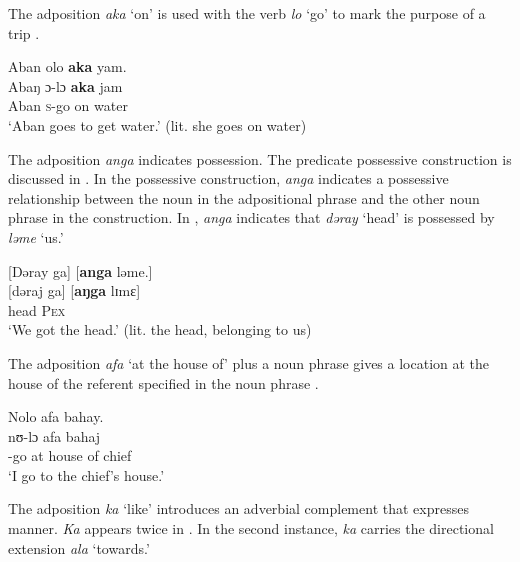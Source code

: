 The adposition \textit{aka}  ‘on’ is used with the verb \textit{lo} ‘go’ to mark the purpose of a trip .

\ea \label{ex:5:132}
Aban  olo  \textbf{aka}  yam.\\
\gll  Abaŋ  ɔ{}-lɔ   \textbf{aka}   jam\\
      Aban  \textsc{s}-go  on  water\\
\glt  ‘Aban goes to get water.’ (lit. she goes on water)
\z

The adposition \textit{anga} indicates possession. The predicate possessive construction is discussed in . In the possessive construction, \textit{anga} indicates a possessive relationship between the noun in the adpositional phrase and the other noun phrase in the construction. In , \textit{anga}  indicates that \textit{dəray} ‘head’ is possessed by \textit{ləme} ‘us.’

\ea \label{ex:5:133}
{}[Dəray  ga]  [\textbf{anga}  ləme.]\\
\gll  {}[dəraj  ga]    [\textbf{aŋga}  lɪmɛ]\\
      head  {\ADJ}    {\POSS}  \textsc{Pex}\\
\glt  ‘We got the head.’ (lit. the head, belonging to us)
\z

The adposition \textit{afa} ‘at the house of’ plus a noun phrase gives a location at the house of the referent specified in the noun phrase . 

\ea \label{ex:5:134}
Nolo  afa  bahay.\\
\gll  nʊ{}-lɔ   afa    bahaj\\
      {\oneS}-go  {at house of}  chief\\
\glt  ‘I go to the chief’s house.’
\z

The adposition \textit{ka} ‘like’ introduces an adverbial complement that expresses manner. \textit{Ka} appears twice in . In the second instance, \textit{ka} carries the directional extension \textit{ala} ‘towards.’

